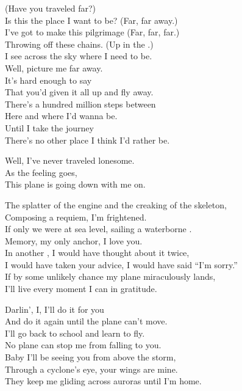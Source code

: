 (Have you traveled far?) \\
Is this the place I want to be? (Far, far away.) \\
I've got to make this pilgrimage (Far, far, far.) \\
Throwing off these chains. (Up in the .) \\
I see across the sky where I need to be. \\

Well, picture me far away. \\
It's hard enough to say \\
That you'd given it all up and fly away. \\
There's a hundred million steps between \\
Here and where I'd wanna be. \\
Until I take the journey \\
There's no other place I think I'd rather be. \\


Well, I've never traveled lonesome. \\
As the feeling goes, \\
This plane is going down with me on. \\


The splatter of the engine and the creaking of the skeleton, \\
Composing a requiem, I'm frightened. \\
If only we were at sea level, sailing a waterborne . \\
Memory, my only anchor, I love you. \\

In another , I would have thought about it twice, \\
I would have taken your advice, I would have said ``I'm sorry.'' \\
If by some unlikely chance my plane miraculously lands, \\
I'll live every moment I can in gratitude. \\


Darlin', I, I'll do it for you \\
And do it again until the plane can't move. \\
I'll go back to school and learn to fly. \\
No plane can stop me from falling to you. \\
Baby I'll be seeing you from above the storm, \\
Through a cyclone's eye, your wings are mine. \\
They keep me gliding across auroras until I'm home. \\

